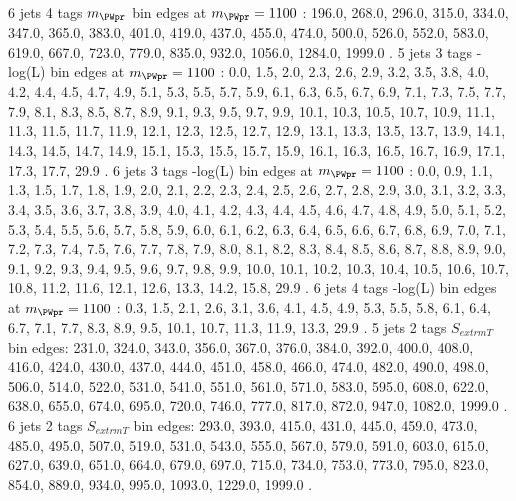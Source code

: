 6 jets 4 \Pqb tags $m_{\PWpr}$ bin edges at $m_{\PWpr}=1100$ \GeV:
196.0, 268.0, 296.0, 315.0, 334.0, 347.0, 365.0, 383.0, 401.0, 419.0, 437.0, 455.0, 474.0, 500.0, 526.0, 552.0, 583.0, 619.0, 667.0, 723.0, 779.0, 835.0, 932.0, 1056.0, 1284.0, 1999.0 .
5 jets 3 \Pqb tags -log(L) bin edges at $m_{\PWpr}=1100$ \GeV:
0.0, 1.5, 2.0, 2.3, 2.6, 2.9, 3.2, 3.5, 3.8, 4.0, 4.2, 4.4, 4.5, 4.7, 4.9, 5.1, 5.3, 5.5, 5.7, 5.9, 6.1, 6.3, 6.5, 6.7, 6.9, 7.1, 7.3, 7.5, 7.7, 7.9, 8.1, 8.3, 8.5, 8.7, 8.9, 9.1, 9.3, 9.5, 9.7, 9.9, 10.1, 10.3, 10.5, 10.7, 10.9, 11.1, 11.3, 11.5, 11.7, 11.9, 12.1, 12.3, 12.5, 12.7, 12.9, 13.1, 13.3, 13.5, 13.7, 13.9, 14.1, 14.3, 14.5, 14.7, 14.9, 15.1, 15.3, 15.5, 15.7, 15.9, 16.1, 16.3, 16.5, 16.7, 16.9, 17.1, 17.3, 17.7, 29.9 .
6 jets 3 \Pqb tags -log(L) bin edges at $m_{\PWpr}=1100$ \GeV:
0.0, 0.9, 1.1, 1.3, 1.5, 1.7, 1.8, 1.9, 2.0, 2.1, 2.2, 2.3, 2.4, 2.5, 2.6, 2.7, 2.8, 2.9, 3.0, 3.1, 3.2, 3.3, 3.4, 3.5, 3.6, 3.7, 3.8, 3.9, 4.0, 4.1, 4.2, 4.3, 4.4, 4.5, 4.6, 4.7, 4.8, 4.9, 5.0, 5.1, 5.2, 5.3, 5.4, 5.5, 5.6, 5.7, 5.8, 5.9, 6.0, 6.1, 6.2, 6.3, 6.4, 6.5, 6.6, 6.7, 6.8, 6.9, 7.0, 7.1, 7.2, 7.3, 7.4, 7.5, 7.6, 7.7, 7.8, 7.9, 8.0, 8.1, 8.2, 8.3, 8.4, 8.5, 8.6, 8.7, 8.8, 8.9, 9.0, 9.1, 9.2, 9.3, 9.4, 9.5, 9.6, 9.7, 9.8, 9.9, 10.0, 10.1, 10.2, 10.3, 10.4, 10.5, 10.6, 10.7, 10.8, 11.2, 11.6, 12.1, 12.6, 13.3, 14.2, 15.8, 29.9 .
6 jets 4 \Pqb tags -log(L) bin edges at $m_{\PWpr}=1100$ \GeV:
0.3, 1.5, 2.1, 2.6, 3.1, 3.6, 4.1, 4.5, 4.9, 5.3, 5.5, 5.8, 6.1, 6.4, 6.7, 7.1, 7.7, 8.3, 8.9, 9.5, 10.1, 10.7, 11.3, 11.9, 13.3, 29.9 .
5 jets 2 \PQb tags $S_{	extrm{T}}$ bin edges:
231.0, 324.0, 343.0, 356.0, 367.0, 376.0, 384.0, 392.0, 400.0, 408.0, 416.0, 424.0, 430.0, 437.0, 444.0, 451.0, 458.0, 466.0, 474.0, 482.0, 490.0, 498.0, 506.0, 514.0, 522.0, 531.0, 541.0, 551.0, 561.0, 571.0, 583.0, 595.0, 608.0, 622.0, 638.0, 655.0, 674.0, 695.0, 720.0, 746.0, 777.0, 817.0, 872.0, 947.0, 1082.0, 1999.0 .
6 jets 2 \PQb tags $S_{	extrm{T}}$ bin edges:
293.0, 393.0, 415.0, 431.0, 445.0, 459.0, 473.0, 485.0, 495.0, 507.0, 519.0, 531.0, 543.0, 555.0, 567.0, 579.0, 591.0, 603.0, 615.0, 627.0, 639.0, 651.0, 664.0, 679.0, 697.0, 715.0, 734.0, 753.0, 773.0, 795.0, 823.0, 854.0, 889.0, 934.0, 995.0, 1093.0, 1229.0, 1999.0 .
